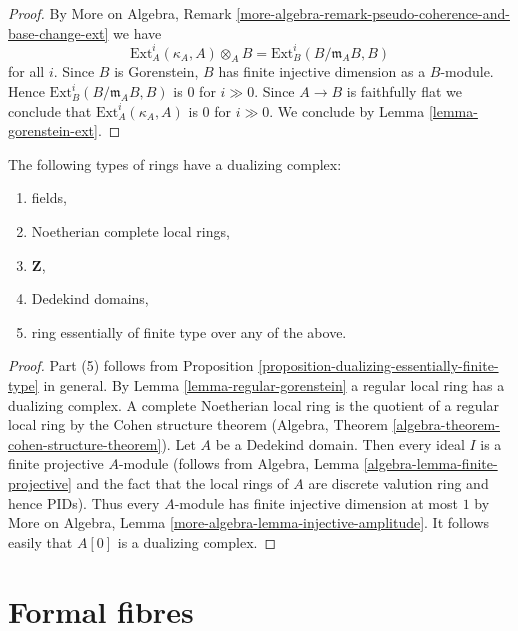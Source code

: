 \begin{proof}
By More on Algebra, Remark
\ref{more-algebra-remark-pseudo-coherence-and-base-change-ext}
we have
$$
\text{Ext}^i_A(\kappa_A, A) \otimes_A B =
\text{Ext}^i_B(B/\mathfrak m_A B, B)
$$
for all $i$. Since $B$ is Gorenstein, $B$ has finite injective dimension
as a $B$-module. Hence $\text{Ext}^i_B(B/\mathfrak m_A B, B)$
is $0$ for $i \gg 0$. Since $A \to B$ is faithfully flat
we conclude that $\text{Ext}^i_A(\kappa_A, A)$ is $0$
for $i \gg 0$. We conclude by Lemma \ref{lemma-gorenstein-ext}.
\end{proof}

\begin{lemma}
\label{lemma-ubiquity-dualizing}
The following types of rings have a dualizing complex:
\begin{enumerate}
\item fields,
\item Noetherian complete local rings,
\item $\mathbf{Z}$,
\item Dedekind domains,
\item ring essentially of finite type over any of the above.
\end{enumerate}
\end{lemma}

\begin{proof}
Part (5) follows from
Proposition \ref{proposition-dualizing-essentially-finite-type}
in general.
By Lemma \ref{lemma-regular-gorenstein} a regular local ring has a
dualizing complex.
A complete Noetherian local ring is the quotient of a regular
local ring by the Cohen structure theorem
(Algebra, Theorem \ref{algebra-theorem-cohen-structure-theorem}).
Let $A$ be a Dedekind domain. Then every ideal $I$ is a finite
projective $A$-module (follows from
Algebra, Lemma \ref{algebra-lemma-finite-projective}
and the fact that the local rings of $A$ are discrete valution ring
and hence PIDs). Thus every $A$-module has finite injective dimension
at most $1$ by
More on Algebra, Lemma \ref{more-algebra-lemma-injective-amplitude}.
It follows easily that $A[0]$ is a dualizing complex.
\end{proof}





\section{Formal fibres}
\label{section-formal-fibres}

